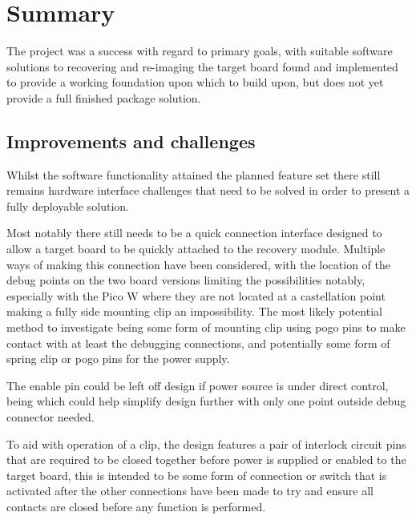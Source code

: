 \clearpage%
\vspace{21.5pt}
\chapter{Summary}

The project was a success with regard to primary goals, with suitable software solutions to recovering and re-imaging the target board found and implemented to provide a working foundation upon which to build upon, but does not yet provide a full finished package solution.

\section{Improvements and challenges}

Whilst the software functionality attained the planned feature set there still remains hardware interface challenges that need to be solved in order to present a fully deployable solution.

Most notably there still needs to be a quick connection interface designed to allow a target board to be quickly attached to the recovery module. Multiple ways of making this connection have been considered, with the location of the debug points on the two board versions limiting the possibilities notably, especially with the Pico W where they are not located at a castellation point making a fully side mounting clip an impossibility.  The most likely potential method to investigate being some form of mounting clip using pogo pins to make contact with at least the debugging connections, and potentially some form of spring clip or pogo pins for the power supply.

The enable pin could be left off design if power source is under direct control, being which could help simplify design further with only one point outside debug connector needed.

To aid with operation of a clip, the design features a pair of interlock circuit pins that are required to be closed together before power is supplied or enabled to the target board, this is intended to be some form of connection or switch that is activated after the other connections have been made to try and ensure all contacts are closed before any function is performed.

